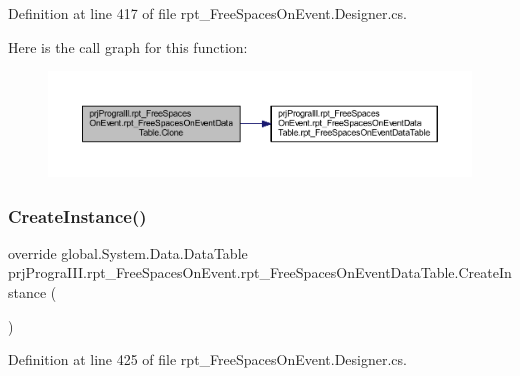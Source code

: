 Definition at line 417 of file rpt\+\_\+\+Free\+Spaces\+On\+Event.\+Designer.\+cs.

Here is the call graph for this function\+:
\nopagebreak
\begin{figure}[H]
\begin{center}
\leavevmode
\includegraphics[width=350pt]{classprj_progra_i_i_i_1_1rpt___free_spaces_on_event_1_1rpt___free_spaces_on_event_data_table_ad22261209728da11260b9ec279fdeb3b_cgraph}
\end{center}
\end{figure}
\hypertarget{classprj_progra_i_i_i_1_1rpt___free_spaces_on_event_1_1rpt___free_spaces_on_event_data_table_aac3179473fb0afa8971f26df1c7195ae}{}\label{classprj_progra_i_i_i_1_1rpt___free_spaces_on_event_1_1rpt___free_spaces_on_event_data_table_aac3179473fb0afa8971f26df1c7195ae} 
\subsubsection{\texorpdfstring{Create\+Instance()}{CreateInstance()}}
{\footnotesize\ttfamily override global.\+System.\+Data.\+Data\+Table prj\+Progra\+I\+I\+I.\+rpt\+\_\+\+Free\+Spaces\+On\+Event.\+rpt\+\_\+\+Free\+Spaces\+On\+Event\+Data\+Table.\+Create\+Instance (\begin{DoxyParamCaption}{ }\end{DoxyParamCaption})\hspace{0.3cm}{\ttfamily [protected]}}



Definition at line 425 of file rpt\+\_\+\+Free\+Spaces\+On\+Event.\+Designer.\+cs.

